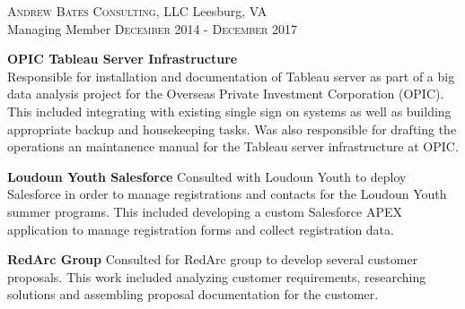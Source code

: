
\textsc{Andrew Bates Consulting, LLC} \hfill Leesburg, VA\\
Managing Member \hfill \textsc{December 2014} - \textsc{December 2017}

\textbf{OPIC Tableau Server Infrastructure}\\
Responsible for installation and documentation of Tableau server as part of a
big data analysis project for the Overseas Private Investment Corporation (OPIC).  This
included integrating with existing single sign on systems as well as building
appropriate backup and housekeeping tasks.  Was also responsible for drafting
the operations an maintanence manual for the Tableau server infrastructure at
OPIC.

\textbf{Loudoun Youth Salesforce}
Consulted with Loudoun Youth to deploy Salesforce in order to manage
registrations and contacts for the Loudoun Youth summer programs.  This included
developing a custom Salesforce APEX application to manage registration forms and
collect registration data.

\textbf{RedArc Group}
Consulted for RedArc group to develop several customer proposals.  This work included analyzing customer requirements, researching solutions and assembling proposal documentation for the customer.